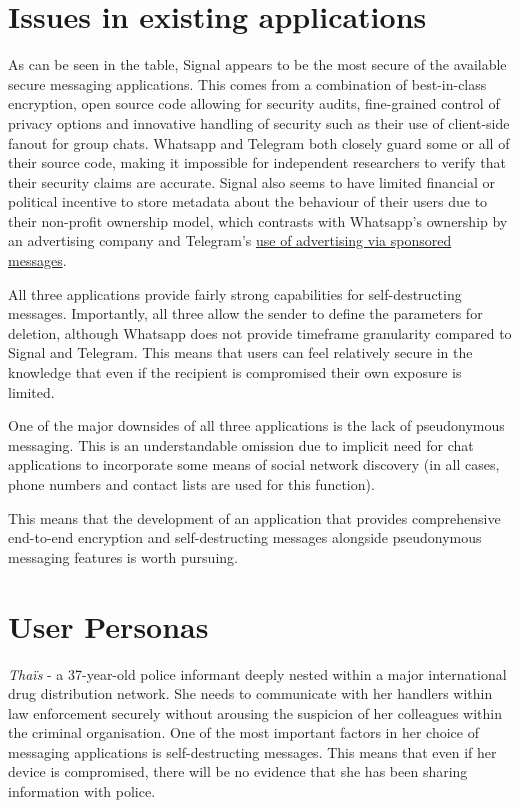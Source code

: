 \documentclass{mproj}
\begin{document}
\section{Issues in existing applications}
As can be seen in the table, Signal appears to be the most secure of the available secure messaging applications. This comes from a combination of best-in-class encryption, open source code allowing for security audits, fine-grained control of privacy options and innovative handling of security such as their use of client-side fanout for group chats. Whatsapp and Telegram both closely guard some or all of their source code, making it impossible for independent researchers to verify that their security claims are accurate. Signal also seems to have limited financial or political incentive to store metadata about the behaviour of their users due to their non-profit ownership model, which contrasts with Whatsapp's ownership by an advertising company and Telegram's \href{https://promote.telegram.org/}{use of advertising via sponsored messages}.

All three applications provide fairly strong capabilities for self-destructing messages. Importantly, all three allow the sender to define the parameters for deletion, although Whatsapp does not provide timeframe granularity compared to Signal and Telegram. This means that users can feel relatively secure in the knowledge that even if the recipient is compromised their own exposure is limited.

One of the major downsides of all three applications is the lack of pseudonymous messaging. This is an understandable omission due to implicit need for chat applications to incorporate some means of social network discovery (in all cases, phone numbers and contact lists are used for this function). 

This means that the development of an application that provides comprehensive end-to-end encryption and self-destructing messages alongside pseudonymous messaging features is worth pursuing.

\section{User Personas}

\emph{Thaïs} - a 37-year-old police informant deeply nested within a major international drug distribution network. She needs to communicate with her handlers within law enforcement securely without arousing the suspicion of her colleagues within the criminal organisation. One of the most important factors in her choice of messaging applications is self-destructing messages. This means that even if her device is compromised, there will be no evidence that she has been sharing information with police.
\end{document}
